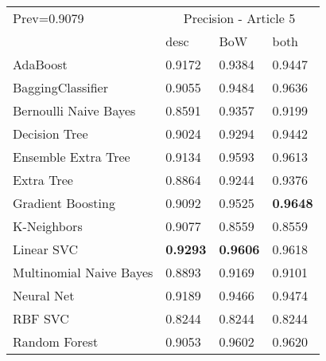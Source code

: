 \begin{tabular}{|l|l|l|l| }
\hline
Prev=0.9079 &  \multicolumn{3}{c|}{Precision - Article 5} \\
\cline{2-4} & desc & BoW & both \\ \hline
AdaBoost                & 0.9172 & 0.9384 & 0.9447\\
BaggingClassifier       & 0.9055 & 0.9484 & 0.9636\\
Bernoulli Naive Bayes   & 0.8591 & 0.9357 & 0.9199\\
Decision Tree           & 0.9024 & 0.9294 & 0.9442\\
Ensemble Extra Tree     & 0.9134 & 0.9593 & 0.9613\\
Extra Tree              & 0.8864 & 0.9244 & 0.9376\\
Gradient Boosting       & 0.9092 & 0.9525 & {\bf 0.9648}\\
K-Neighbors             & 0.9077 & 0.8559 & 0.8559\\
Linear SVC              & {\bf 0.9293} & {\bf 0.9606} & 0.9618\\
Multinomial Naive Bayes & 0.8893 & 0.9169 & 0.9101\\
Neural Net              & 0.9189 & 0.9466 & 0.9474\\
RBF SVC                 & 0.8244 & 0.8244 & 0.8244\\
Random Forest           & 0.9053 & 0.9602 & 0.9620\\
\hline
\end{tabular}